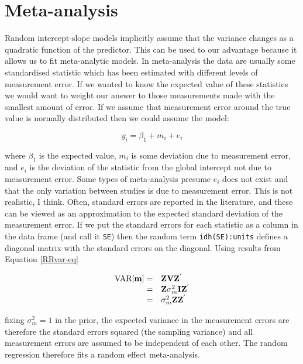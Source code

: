 \documentclass{article}
\begin{document}
\section{Meta-analysis}
\label{meta-sec}

Random intercept-slope models implicitly assume that the variance changes as a quadratic function of the predictor. This can be used to our advantage because it allows us to fit meta-analytic models. In meta-analysis the data are usually some standardised statistic which has been estimated with different levels of measurement error. If we wanted to know the expected value of these statistics we would want to weight our answer to those measurements made with the smallest amount of error.  If we assume that measurement error around the true value is normally distributed then we could assume the model:


\begin{equation}
y_{i} = \beta_{1} + m_{i} +e _{i}
\end{equation} 
 
where $\beta_{1}$ is the expected value, $m_{i}$ is some deviation due to measurement error, and $e_{i}$ is the deviation of the statistic from the global intercept not due to measurement error. Some types of meta-analysis presume $e_{i}$ does not exist and that the only variation between studies is due to measurement error. This is not realistic, I think.  Often, standard errors are reported in the literature, and these can be viewed as an approximation to the expected standard deviation of the measurement error. If we put the standard errors for each statistic as a column in the data frame (and call it \texttt{SE}) then the random term \texttt{idh(SE):units} defines a diagonal matrix with the standard errors on the diagonal. Using results from Equation \ref{RRvar-eq}


\begin{equation}
\begin{array}{rl}
\textrm{VAR}[{\bf m}] =& {\bf Z}{\bf V}{\bf Z}^{'}\\ 
               =& {\bf Z}\sigma^{2}_{m}{\bf I}{\bf Z}^{'}\\ 
               =& \sigma^{2}_{m}{\bf Z}{\bf Z}^{'}\\                               
\end{array}
\end{equation} 

fixing $\sigma^{2}_{m}=1$ in the prior, the expected variance in the measurement errors are therefore the standard errors squared (the sampling variance) and all measurement errors are assumed to be independent of each other. The random regression therefore fits a random effect meta-analysis.   
\end{document}
